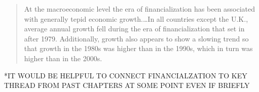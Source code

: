 \begin{quotation}At the macroeconomic level the era of financialization has been associated with generally tepid economic growth.\dots  In all countries except the U.K., average annual growth fell during the era of financialization that set in after 1979. Additionally, growth also appears to show a slowing trend so that growth in the 1980s was higher than in the 1990s, which in turn was higher than in the 2000s. \end{quotation}




*IT WOULD BE HELPFUL TO CONNECT FINANCIALZATION TO KEY THREAD FROM PAST CHAPTERS AT SOME POINT EVEN IF BRIEFLY
